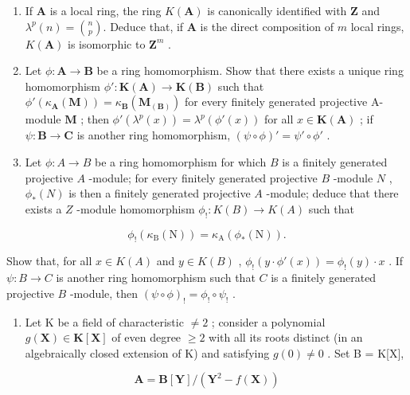 \begin{enumerate}
\def\labelenumi{(\alph{enumi})}
\setcounter{enumi}{2}
\item
  If \(\mathbf{A}\) is a local ring, the ring \(K(\mathbf{A})\) is canonically identified with \(\mathbf{Z}\) and \(\lambda^p(n) = \binom{n}{p}\). Deduce that, if \(\mathbf{A}\) is the direct composition of \(m\) local rings, \(K(\mathbf{A})\) is isomorphic to \(\mathbf{Z}^m\) .
\item
  Let \(\phi: \mathbf{A} \to \mathbf{B}\) be a ring homomorphism. Show that there exists a unique ring homomorphism \(\phi': \mathbf{K}(\mathbf{A}) \to \mathbf{K}(\mathbf{B})\) such that \(\phi'(\kappa_{\mathbf{A}}(\mathbf{M})) = \kappa_{\mathbf{B}}(\mathbf{M}_{(\mathbf{B})})\) for every finitely generated projective A-module \(\mathbf{M}\) ; then \(\phi'(\lambda^p(x)) = \lambda^p(\phi'(x))\) for all \(x \in \mathbf{K}(\mathbf{A})\) ; if \(\psi: \mathbf{B} \to \mathbf{C}\) is another ring homomorphism, \((\psi \circ \phi)' = \psi' \circ \phi'\) .
\item
  Let \(\phi: A \to B\) be a ring homomorphism for which \(B\) is a finitely generated projective \(A\) -module; for every finitely generated projective \(B\) -module \(N\) , \(\phi_{*}(N)\) is then a finitely generated projective \(A\) -module; deduce that there exists a \(Z\) -module homomorphism \(\phi_!: K(B) \to K(A)\) such that
\end{enumerate}

\[
\phi_! (\kappa_ {\mathrm{B}} (\mathrm{N})) = \kappa_ {\mathrm{A}} (\phi_ {*} (\mathrm{N})).
\]

Show that, for all \(x \in K(A)\) and \(y \in K(B)\) , \(\phi_!(y \cdot \phi'(x)) = \phi_!(y) \cdot x\) . If \(\psi: B \to C\) is another ring homomorphism such that \(C\) is a finitely generated projective \(B\) -module, then \((\psi \circ \phi)_! = \phi_! \circ \psi_!\) .

\begin{enumerate}
\def\labelenumi{\arabic{enumi}.}
\setcounter{enumi}{10}
\tightlist
\item
  Let K be a field of characteristic \(\neq2\) ; consider a polynomial \(g(\mathbf{X})\in\mathbf{K}[\mathbf{X}]\) of even degree \(\geqslant2\) with all its roots distinct (in an algebraically closed extension of K) and satisfying \(g(0)\neq0\) . Set B = K{[}X{]},
\end{enumerate}

\[
\mathbf {A} = \mathbf {B} [ \mathbf {Y} ] / (\mathbf {Y} ^ {2} - f (\mathbf {X}))
\]

